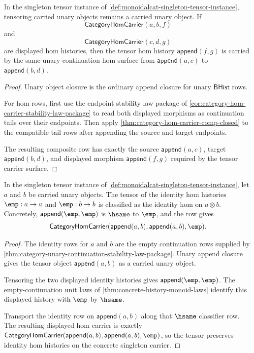 \begin{theorem}
\label{thm:monoidalcat-singleton-tensor-carrier}
In the singleton tensor instance of \autoref{def:monoidalcat-singleton-tensor-instance}, tensoring carried unary objects remains a carried unary object. If
$$
\mathsf{CategoryHomCarrier}(a,b,f)
$$
and
$$
\mathsf{CategoryHomCarrier}(c,d,g)
$$
are displayed hom histories, then the tensor hom history $\mathsf{append}(f,g)$ is carried by the same unary-continuation hom surface from $\mathsf{append}(a,c)$ to $\mathsf{append}(b,d)$.
\end{theorem}
\begin{proof}
Unary object closure is the ordinary append closure for unary $\mathsf{BHist}$ rows.

For hom rows, first use the endpoint stability law package of \autoref{cor:category-hom-carrier-stability-law-package} to read both displayed morphisms as continuation tails over their endpoints. Then apply \autoref{thm:category-hom-carrier-comp-closed} to the compatible tail rows after appending the source and target endpoints.

The resulting composite row has exactly the source $\mathsf{append}(a,c)$, target $\mathsf{append}(b,d)$, and displayed morphism $\mathsf{append}(f,g)$ required by the tensor carrier surface.
\end{proof}

\begin{theorem}
\label{thm:monoidalcat-singleton-tensor-identity-hom}
In the singleton tensor instance of \autoref{def:monoidalcat-singleton-tensor-instance}, let $a$ and $b$ be carried unary objects. The tensor of the identity hom histories $\emp:a\to a$ and $\emp:b\to b$ is classified as the identity hom on $a\otimes b$. Concretely, $\mathsf{append}(\emp,\emp)$ is $\hsame$ to $\emp$, and the row gives
$$
\mathsf{CategoryHomCarrier}(\mathsf{append}(a,b),\mathsf{append}(a,b),\emp).
$$
\end{theorem}
\begin{proof}
The identity rows for $a$ and $b$ are the empty continuation rows supplied by \autoref{thm:category-unary-continuation-stability-law-package}. Unary append closure gives the tensor object $\mathsf{append}(a,b)$ as a carried unary object.

Tensoring the two displayed identity histories gives $\mathsf{append}(\emp,\emp)$. The empty-continuation unit laws of \autoref{thm:concrete-history-monoid-laws} identify this displayed history with $\emp$ by $\hsame$.

Transport the identity row on $\mathsf{append}(a,b)$ along that $\hsame$ classifier row. The resulting displayed hom carrier is exactly $\mathsf{CategoryHomCarrier}(\mathsf{append}(a,b),\mathsf{append}(a,b),\emp)$, so the tensor preserves identity hom histories on the concrete singleton carrier.
\end{proof}

